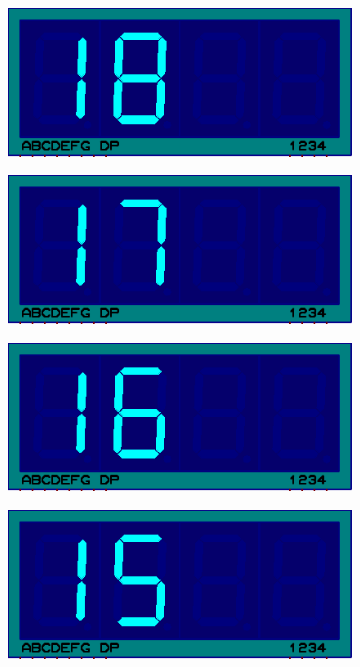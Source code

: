 \documentclass{lab_sheet}
\begin{document}
\begin{figure}[H]
\begin{subfigure}{.33\textwidth}
            \includegraphics[frame,width=.9\linewidth]{../Figures/d18}   
            \caption{}
            \label{fig:prob2-w}
          \end{subfigure}
          \begin{subfigure}{.33\textwidth}
            \centering
            \includegraphics[frame,width=.9\linewidth]{../Figures/d17}   
            \caption{}
            \label{fig:prob2-x}
          \end{subfigure}
          \newline
          \begin{subfigure}{.33\textwidth}
            \centering
            \includegraphics[frame,width=.9\linewidth]{../Figures/d16}   
            \caption{}
            \label{fig:prob2-y}
          \end{subfigure}
          \begin{subfigure}{.33\textwidth}
            \centering
            \includegraphics[frame,width=.9\linewidth]{../Figures/d15}   

\end{subfigure}
\end{figure}
\end{document}
